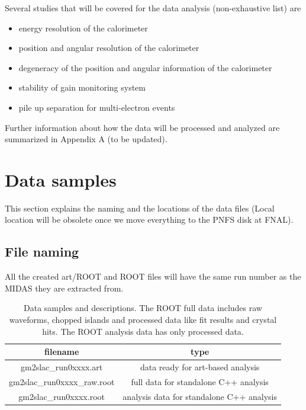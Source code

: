 \documentclass[12pt,letterpaper]{article}
\begin{document}
Several studies that will be covered for the data analysis (non-exhaustive list) are
\begin{itemize}
\item energy resolution of the calorimeter
\item position and angular resolution of the calorimeter
\item degeneracy of the position and angular information of the calorimeter
\item stability of gain monitoring system
\item pile up separation for multi-electron events
\end{itemize}

Further information about how the data will be processed and analyzed are summarized in Appendix A (to be updated).


\section{Data samples}
This section explains the naming and the locations of the data files (Local location will be obsolete once we move everything
to the PNFS disk at FNAL).

\subsection{File naming}

All the created art/ROOT and ROOT files will have the same run number as the MIDAS they are extracted from.

\begin{table}[htbp]
\centering
\caption{Data samples and descriptions. The ROOT full data includes raw waveforms, chopped islands and processed data like fit results and crystal hits. The ROOT analysis data has only processed data.}
\begin{tabular}{|c|c|} \hline 
filename & type \\ \hline 
gm2slac\_run0xxxx.art & data ready for art-based analysis \\ \hline 
gm2slac\_run0xxxx\_raw.root & full data for standalone C++ analysis \\ \hline 
gm2slac\_run0xxxx.root & analysis data for standalone C++ analysis \\ \hline 
\end{tabular} \label{tab:datasamples}
\end{table}
\end{document}
